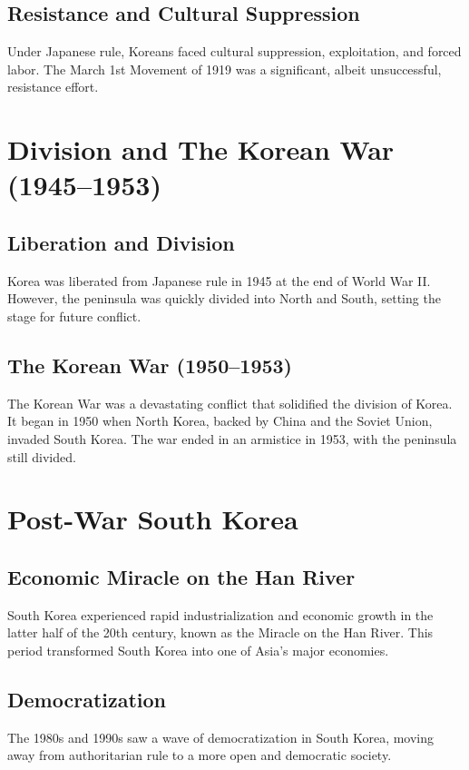\documentclass{book}
\begin{document}
\subsection{Resistance and Cultural Suppression}
\label{subsec:resistance-cultural-suppression}
Under Japanese rule, Koreans faced cultural suppression, exploitation, and forced labor. The March 1st Movement of 1919 was a significant, albeit unsuccessful, resistance effort.

\section{Division and The Korean War (1945–1953)}
\label{sec:division-korean-war}

\subsection{Liberation and Division}
\label{subsec:liberation-division}
Korea was liberated from Japanese rule in 1945 at the end of World War II. However, the peninsula was quickly divided into North and South, setting the stage for future conflict.

\subsection{The Korean War (1950–1953)}
\label{subsec:korean-war}
The Korean War was a devastating conflict that solidified the division of Korea. It began in 1950 when North Korea, backed by China and the Soviet Union, invaded South Korea. The war ended in an armistice in 1953, with the peninsula still divided.

\section{Post-War South Korea}
\label{sec:post-war-south-korea}

\subsection{Economic Miracle on the Han River}
\label{subsec:economic-miracle}
South Korea experienced rapid industrialization and economic growth in the latter half of the 20th century, known as the Miracle on the Han River. This period transformed South Korea into one of Asia’s major economies.

\subsection{Democratization}
\label{subsec:democratization}
The 1980s and 1990s saw a wave of democratization in South Korea, moving away from authoritarian rule to a more open and democratic society.
\end{document}
